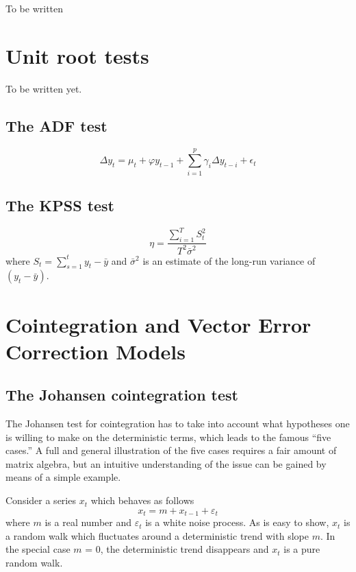 To be written

\section{Unit root tests}
\label{sec:uroot}

To be written yet.

\subsection{The ADF test}
\label{sec:ADFtest}
\begin{equation}
  \label{eq:ADFtest}
  \Delta y_t = \mu_t + \varphi y_{t-1} + \sum_{i=1}^p \gamma_i \Delta
  y_{t-i} + \epsilon_t
\end{equation}

\subsection{The KPSS test}
\label{sec:KPSStest}

\begin{equation}
  \label{eq:KPSStest}
  \eta = \frac{\sum_{i=1}^T S_t^2 }{ T^2 \bar{\sigma}^2 }
\end{equation}
where $S_t = \sum_{s=1}^t y_t - \bar{y}$ and $\bar{\sigma}^2$ is an
estimate of the long-run variance of $(y_t - \bar{y})$.




\section{Cointegration and Vector Error Correction Models}
\label{vecm-explanation}

\subsection{The Johansen cointegration test}
\label{johansen-test}

The Johansen test for cointegration has to take into account what
hypotheses one is willing to make on the deterministic terms, which
leads to the famous ``five cases.'' A full and general illustration of
the five cases requires a fair amount of matrix algebra, but an
intuitive understanding of the issue can be gained by means of a
simple example.
    
Consider a series $x_t$ which behaves as follows
%      
\[ x_t = m + x_{t-1} + \varepsilon_t \] 
%
where $m$ is a real number and $\varepsilon_t$ is a white noise
process. As is easy to show, $x_t$ is a random walk which fluctuates
around a deterministic trend with slope $m$. In the special case $m$ =
0, the deterministic trend disappears and $x_t$ is a pure random walk.
    
